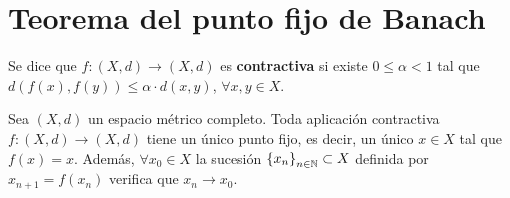 \section{Teorema del punto fijo de Banach}
\begin{definition}
Se dice que $\displaystyle f : \left(X,d\right)\to \left(X,d\right) $ es \textbf{contractiva} si existe $\displaystyle 0 \leq \alpha < 1 $ tal que $\displaystyle d\left(f\left(x\right),f\left(y\right)\right) \leq \alpha \cdot d\left(x,y\right) $, $\displaystyle \forall x,y \in X $.
\end{definition}
\begin{theorem}
	Sea $\displaystyle \left(X,d\right) $ un espacio métrico completo. Toda aplicación contractiva $\displaystyle f:\left(X,d\right) \to \left(X,d\right) $ tiene un único punto fijo, es decir, un único $\displaystyle x \in X $ tal que $\displaystyle f\left(x\right) = x $. Además, $\displaystyle \forall x_{0} \in X $ la sucesión $\displaystyle \left\{ x_{n}\right\} _{n\in\mathbb{N}} \subset X $ definida por $\displaystyle x_{n+1} = f\left(x_{n}\right) $ verifica que $\displaystyle x_{n} \to x_{0} $.
\end{theorem}
